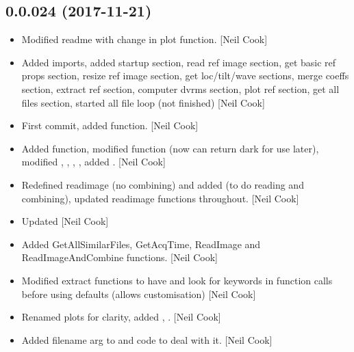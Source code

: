 \documentclass[a4paper,10pt,english]{report}
\begin{document}
\subsection{0.0.024 (2017-11-21)}
\label{\detokenize{misc/changelog:id527}}\begin{itemize}
\item {} 
Modified readme with change in plot function. {[}Neil Cook{]}

\item {} 
Added imports, added startup section, read ref image section, get
basic ref props section, resize ref image section, get loc/tilt/wave
sections, merge coeffs section, extract ref section, computer dvrms
section, plot ref section, get all files section, started all file
loop (not finished) {[}Neil Cook{]}

\item {} 
First commit, added  function. {[}Neil Cook{]}

\item {} 
Added  function, modified 
function (now can return dark for use later), modified ,
, , , added . {[}Neil Cook{]}

\item {} 
Redefined readimage (no combining) and added  (to
do reading and combining), updated readimage functions throughout.
{[}Neil Cook{]}

\item {} 
Updated  {[}Neil Cook{]}

\item {} 
Added GetAllSimilarFiles, GetAcqTime, ReadImage and
ReadImageAndCombine functions. {[}Neil Cook{]}

\item {} 
Modified extract functions to have and look for keywords in function
calls before using defaults (allows customisation) {[}Neil Cook{]}

\item {} 
Renamed plots for clarity, added ,
. {[}Neil Cook{]}

\item {} 
Added filename arg to  and code to deal with it.
{[}Neil Cook{]}


\end{itemize}
\end{document}

